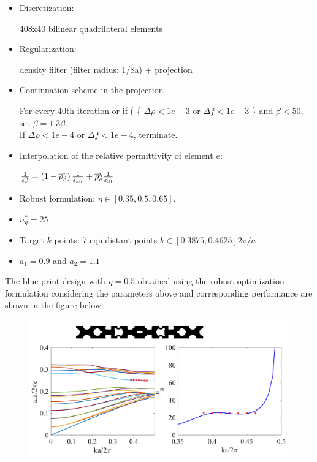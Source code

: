 \documentclass{article}
\begin{document}
\begin{itemize}
	\item Discretization:
	
	 408x40 bilinear quadrilateral elements
	
\item 	Regularization: 

	density filter (filter radius: 1/8a) + projection
	\item Continuation scheme in the projection
	
	 For every $40$th iteration or if ( \{ $\Delta \rho< 1e-3$ or $\Delta f <1e-3$ \} and $\beta < 50$,   set $\beta=1.3 \beta$.  \\
  If $\Delta \rho < 1e-4$ or $\Delta f < 1e-4 $,  terminate. 

\item Interpolation of the relative permittivity of element $e$: 

$\frac{1}{\varepsilon^{\eta}_e} = \left(1- \overline{\rho}^{\eta}_e \right)\frac{1}{\varepsilon_{\rm{air}}} +\overline{\rho}^{\eta}_e  \frac{1}{\varepsilon_{\rm{Si}}}$
\item 	Robust formulation: $ \eta \in [0.35, 0.5, 0.65]$.

\item $n^*_g=25$
\item Target $k$ points:
7  equidistant points $k \in [0.3875, 0.4625]2{\pi}/a$ 
\item $a_1=0.9$ and $a_2=1.1$
\end{itemize}
The blue print design  with $\eta=0.5$ obtained using the robust optimization formulation considering the parameters above and corresponding performance are shown in the figure below. 
 
	\begin{figure}[!h]
	\def\svgwidth{1\textwidth}
	\includegraphics[width=\textwidth]{Resp_Dnum_2_FF.png} 
\end{figure}
\end{document}
